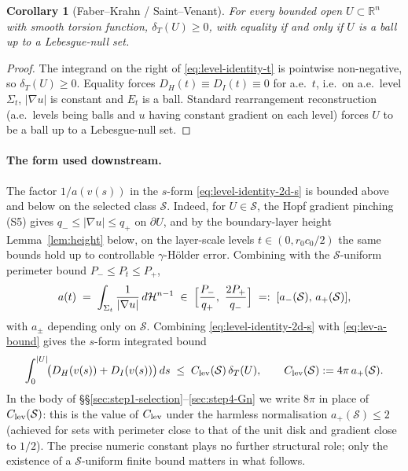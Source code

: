 \documentclass[11pt]{amsart}
\newtheorem{corollary}[theorem]{Corollary}
\newcommand{\R}{\mathbb R}
\newcommand{\dT}{\delta_T}
\newcommand{\HH}{\mathcal H}
\newcommand{\Sclass}{\mathcal S}
\begin{document}
\begin{corollary}[Faber--Krahn / Saint--Venant]\label{cor:FK}
For every bounded open \(U\subset\R^n\) with smooth torsion function,
\(\dT(U)\ge 0\), with equality if and only if \(U\) is a ball up to a
Lebesgue-null set.
\end{corollary}

\begin{proof}
The integrand on the right of \eqref{eq:level-identity-t} is
pointwise non-negative, so \(\dT(U)\ge 0\).  Equality forces
\(D_H(t)\equiv D_I(t)\equiv 0\) for a.e.\ \(t\), i.e.\ on a.e.\ level
\(\Sigma_t\), \(|\nabla u|\) is constant and \(E_t\) is a ball.
Standard rearrangement reconstruction (a.e.\ levels being balls and
\(u\) having constant gradient on each level) forces \(U\) to be a
ball up to a Lebesgue-null set.
\end{proof}

\paragraph{The form used downstream.}
The factor \(1/a(v(s))\) in the \(s\)-form
\eqref{eq:level-identity-2d-s} is bounded above and below on the
selected class \(\Sclass\).  Indeed, for \(U\in\Sclass\), the Hopf
gradient pinching (S5) gives \(q_-\le|\nabla u|\le q_+\) on
\(\partial U\), and by the boundary-layer height
Lemma~\ref{lem:height} below, on the layer-scale levels
\(t\in(0,r_0 c_0/2)\) the same bounds hold up to controllable
\(\gamma\)-Hölder error.  Combining with the \(\Sclass\)-uniform
perimeter bound \(P_-\le P_t\le P_+\),
\begin{equation}\label{eq:lev-a-bound}
   a(t)\;=\;\int_{\Sigma_t}\frac{1}{|\nabla u|}\,d\HH^{n-1}
   \;\in\;\Bigl[\frac{P_-}{q_+},\ \frac{2P_+}{q_-}\Bigr]
   \;=:\;[a_-(\Sclass),\,a_+(\Sclass)],
\end{equation}
with \(a_\pm\) depending only on \(\Sclass\).  Combining
\eqref{eq:level-identity-2d-s} with \eqref{eq:lev-a-bound} gives the
\(s\)-form integrated bound
\begin{equation}\label{eq:level-identity}
   \int_0^{|U|}\!\bigl(D_H(v(s))+D_I(v(s))\bigr)\,ds
   \;\le\;C_{\rm lev}(\Sclass)\,\dT(U),
   \qquad
   C_{\rm lev}(\Sclass):=4\pi\,a_+(\Sclass).
\end{equation}
In the body of \S\S\ref{sec:step1-selection}--\ref{sec:step4-Gn} we
write \(8\pi\) in place of \(C_{\rm lev}(\Sclass)\): this is the
value of \(C_{\rm lev}\) under the harmless normalisation
\(a_+(\Sclass)\le 2\) (achieved for sets with perimeter close to that
of the unit disk and gradient close to \(1/2\)).  The precise numeric
constant plays no further structural role; only the existence of a
\(\Sclass\)-uniform finite bound matters in what follows.
\end{document}
